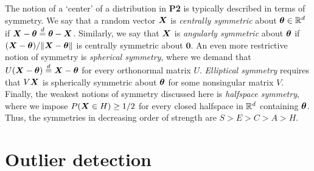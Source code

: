 The notion of a `center' of a distribution in \textbf{P2} is typically
described in terms of symmetry.
We say that a random vector $\bm{X}$ is \emph{centrally symmetric} about
$\bm{\theta} \in \mathbb{R}^d$ if $\bm{X} - \bm{\theta} \overset{d}{=} \bm{\theta} - \bm{X}$.
Similarly, we say that $\bm{X}$ is \emph{angularly symmetric} about $\bm{\theta}$ if
$(\bm{X} - \bm{\theta}) / \Vert \bm{X} - \bm{\theta} \Vert$ is centrally symmetric about $\bm0$.
An even more restrictive notion of symmetry is \emph{spherical symmetry},
where we demand that $U(\bm{X} - \bm{\theta}) \overset{d}{=} \bm{X} - \bm{\theta}$ for every orthonormal
matrix $U$.
\emph{Elliptical symmetry} requires that $V\bm{X}$ is spherically symmetric about
$\bm{\theta}$ for some nonsingular matrix $V$.
Finally, the weakest notions of symmetry discussed here is \emph{halfspace
symmetry}, where we impose $P(\bm{X} \in H) \geq 1/2$ for every closed halfspace
in $\mathbb{R}^d$ containing $\bm{\theta}$.
Thus, the symmetries in decreasing order of strength are $S > E > C > A > H$.














\section{Outlier detection}
